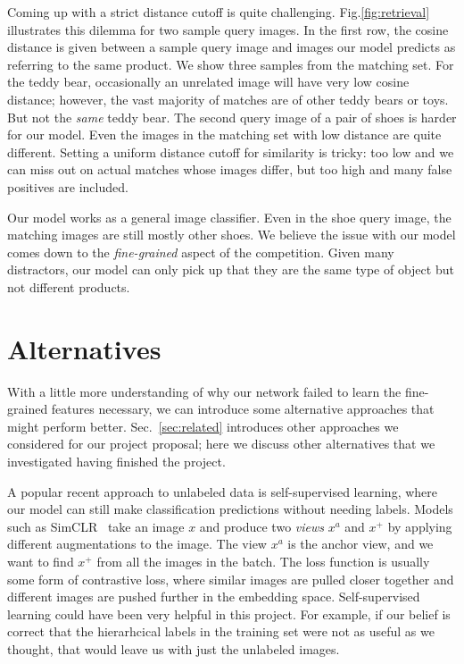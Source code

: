 \documentclass[conference]{IEEEtran}
\begin{document}
Coming up with a strict distance cutoff is quite challenging.
Fig.\ref{fig:retrieval} illustrates this dilemma for two sample query images.
In the first row, the cosine distance is given between a sample query image and 
images our model predicts as referring to the same product.
We show three samples from the matching set.
For the teddy bear, occasionally an unrelated image will have very low cosine distance;
however, the vast majority of matches are of other teddy bears or toys.
But not the \emph{same} teddy bear.
The second query image of a pair of shoes is harder for our model.
Even the images in the matching set with low distance are quite different.
Setting a uniform distance cutoff for similarity is tricky: too low and we can miss 
out on actual matches whose images differ, but too high and many false positives are
included.

Our model works as a general image classifier. 
Even in the shoe query image, the matching images are still mostly other shoes.
We believe the issue with our model comes down to the \emph{fine-grained} aspect of the 
competition.
Given many distractors, our model can only pick up that they are the same type of object
but not different products.

\section{Alternatives}
With a little more understanding of why our network failed to learn the fine-grained
features necessary, we can introduce some alternative approaches that might perform
better.
Sec.~\ref{sec:related} introduces other approaches we considered for our project
proposal; here we discuss other alternatives that we investigated having 
finished the project.

A popular recent approach to unlabeled data is self-supervised learning, where our model can still make
classification predictions without needing labels.
Models such as SimCLR~\cite{chen2020simple} take an image $x$ and produce two \emph{views} $x^a$ and $x^+$ by applying
different augmentations to the image.
The view $x^a$ is the anchor view, and we want to find $x^+$ from all the images in the batch.
The loss function is usually some form of contrastive loss, where similar images are pulled closer together
and different images are pushed further in the embedding space. 
Self-supervised learning could have been very helpful in this project.
For example, if our belief is correct that the hierarhcical labels in the training 
set were not as useful as we thought, that would leave us with just the unlabeled images.
\end{document}
